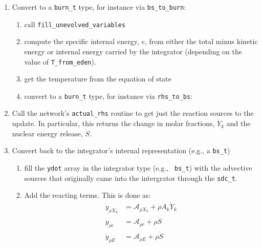 \begin{enumerate}

\item Convert to a {\tt burn\_t} type, for instance via {\tt bs\_to\_burn}:

  \begin{enumerate}

  \item call {\tt fill\_unevolved\_variables}

  \item compute the specific internal energy, $e$, from either the
    total minus kinetic energy or internal energy carried by the
    integrator (depending on the value of {\tt T\_from\_eden}).

  \item get the temperature from the equation of state

  \item convert to a {\tt burn\_t} type, for instance via {\tt rhs\_to\_bs}:

  \end{enumerate}

\item Call the network's {\tt actual\_rhs} routine to get just the 
 reaction sources to the update.  In particular, this returns
 the change in molar fractions, $\dot{Y}_k$ and the nuclear energy
 release, $\dot{S}$.

\item Convert back to the integrator's internal representation (e.g.,
  a {\tt bs\_t})

  \begin{enumerate}
  \item fill the {\tt ydot} array in the integrator type (e.g., {\tt
    bs\_t}) with the advective sources that originally came into the
    intergrator through the {\tt sdc\_t}.

  \item Add the reacting terms.  This is done as:
    \begin{align}
      \dot{y}_{\rho X_k} &= \mathcal{A}_{\rho X_k} + \rho A_k \dot{Y}_k \\
      \dot{y}_{\rho e} &= \mathcal{A}_{\rho e} +\rho \dot{S} \\
      \dot{y}_{\rho E} &= \mathcal{A}_{\rho E} + \rho \dot{S}
    \end{align}
      
  \end{enumerate}

\end{enumerate}

